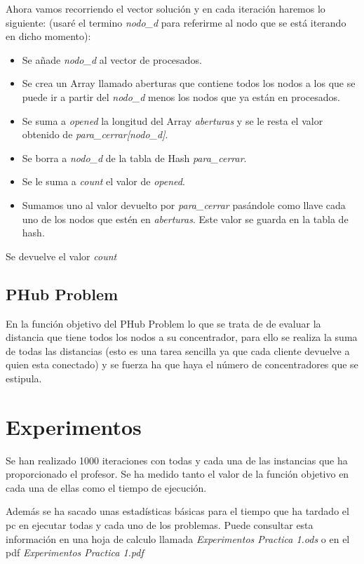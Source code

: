 \documentclass[12pt,a4paper,draft,openany]{article}
\begin{document}
Ahora vamos recorriendo el vector solución y en cada iteración haremos lo siguiente: (usaré el termino \emph{nodo\_d} para referirme al nodo que se está iterando en dicho momento):

\begin{itemize}
\item Se añade \emph{nodo\_d} al vector de procesados.
\item Se crea un Array llamado aberturas que contiene todos los nodos a los que se puede ir a partir del \emph{nodo\_d} menos los nodos que ya están en procesados.
\item Se suma a \emph{opened} la longitud del Array \emph{aberturas} y se le resta el valor obtenido de \emph{para\_cerrar[nodo\_d]}.
\item Se borra a \emph{nodo\_d} de la tabla de Hash \emph{para\_cerrar}.
\item Se le suma a \emph{count} el valor de \emph{opened}.
\item Sumamos uno al valor devuelto por \emph{para\_cerrar} pasándole como llave cada uno de los nodos que estén en \emph{aberturas}. Este valor se guarda en la tabla de hash.
\end{itemize}

Se devuelve el valor \emph{count}

\subsection{PHub Problem}
En la función objetivo del PHub Problem lo que se trata de de evaluar la distancia que tiene todos los nodos a su concentrador, para ello se realiza la suma de todas las distancias (esto es una tarea sencilla ya que cada cliente devuelve a quien esta conectado) y se fuerza ha que haya el número de concentradores que se estipula.

\section{Experimentos}
Se han realizado 1000 iteraciones con todas y cada una de las instancias que ha proporcionado el profesor. Se ha medido tanto el valor de la función objetivo en cada una de ellas como el tiempo de ejecución.

Además se ha sacado unas estadísticas básicas para el tiempo que ha tardado el pc en ejecutar todas y cada uno de los problemas. Puede consultar esta información en una hoja de calculo llamada \emph{Experimentos Practica 1.ods} o en el pdf \emph{Experimentos Practica 1.pdf}
\end{document}
